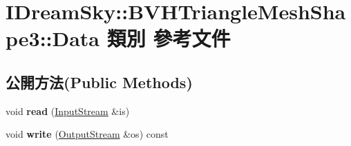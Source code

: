 \hypertarget{class_i_dream_sky_1_1_b_v_h_triangle_mesh_shape3_1_1_data}{}\section{I\+Dream\+Sky\+:\+:B\+V\+H\+Triangle\+Mesh\+Shape3\+:\+:Data 類別 參考文件}
\label{class_i_dream_sky_1_1_b_v_h_triangle_mesh_shape3_1_1_data}
\subsection*{公開方法(Public Methods)}
\begin{DoxyCompactItemize}
\item 
void {\bfseries read} (\hyperlink{class_i_dream_sky_1_1_input_stream}{Input\+Stream} \&is)\hypertarget{class_i_dream_sky_1_1_b_v_h_triangle_mesh_shape3_1_1_data_a30688902e321d811eeee8ac175f4ffb7}{}\label{class_i_dream_sky_1_1_b_v_h_triangle_mesh_shape3_1_1_data_a30688902e321d811eeee8ac175f4ffb7}

\item 
void {\bfseries write} (\hyperlink{class_i_dream_sky_1_1_output_stream}{Output\+Stream} \&os) const \hypertarget{class_i_dream_sky_1_1_b_v_h_triangle_mesh_shape3_1_1_data_a301e85bfc86a86270045102b90e7cae5}{}\label{class_i_dream_sky_1_1_b_v_h_triangle_mesh_shape3_1_1_data_a301e85bfc86a86270045102b90e7cae5}

\end{DoxyCompactItemize}
